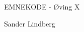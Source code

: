 \documentclass[12pt,a4paper]{article}
\begin{document}
\begin{titlepage}
    \centering
    \vspace*{\fill}

    \vspace*{0.5cm}

    \huge
    EMNEKODE - Øving X

    \vspace*{0.5cm}

    \large Sander Lindberg

    \vspace*{\fill}
    \end{titlepage}

	\newpage
\end{document}
